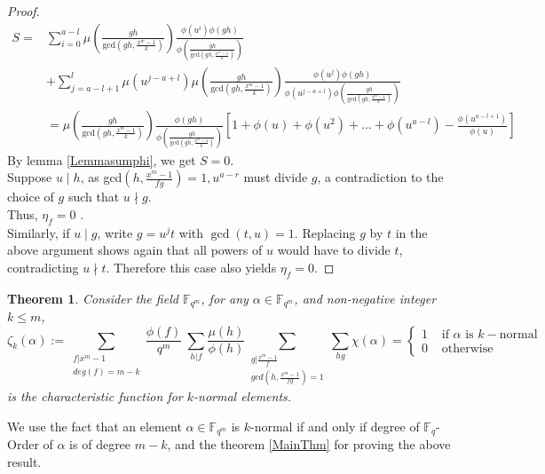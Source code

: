 \documentclass[12pt,a4paper]{article}
\theoremstyle{plain}
\newtheorem{thm}{Theorem}[section]
\theoremstyle{definition}
\numberwithin{equation}{section}
\begin{document}
\begin{proof}
        \begin{align*}
            S =& \displaystyle \sum_{i=0}^{a-l} \mu \left( \frac{gh}{\text{gcd}(gh,\frac{x^m-1}{k})}\right) \frac{\phi(u^i)\phi(gh)}{\phi\left( \frac{gh}{\text{gcd}(gh,\frac{x^m-1}{k})}\right)} \\&+ \sum_{j=a-l+1}^{l} \mu(u^{j-a+l})  \mu \left( \frac{gh}{\text{gcd}(gh,\frac{x^m-1}{k})}\right) \frac{\phi(u^j)\phi(gh)}{\phi(u^{j-a+l})\phi\left( \frac{gh}{\text{gcd}(gh,\frac{x^m-1}{k})}\right)}   \\
            &= \mu \left( \frac{gh}{\text{gcd}(gh,\frac{x^m-1}{k})}\right) \frac{\phi(gh)}{\phi\left( \frac{gh}{\text{gcd}(gh,\frac{x^m-1}{k})}\right)}\left[1+\phi(u)+\phi(u^2)+\dots+ \phi(u^{a-l})-\frac{\phi(u^{a-l+1})}{\phi(u)}\right]
        \end{align*}
        By lemma \ref{Lemmasumphi}, we get $S=0$.\\
        
        Suppose $u \mid h$, as gcd$(h,\frac{x^m-1}{fg}) = 1, u^{a-r}$ must divide $g$, a contradiction to the choice of $g$ such that $u \nmid g$.\\           
        Thus, $\eta_f = 0$ .\\
        Similarly, if $u \mid g$, write $g = u^j t$ with $\gcd(t,u)=1$.  Replacing $g$ by $t$ in the above argument shows again that all powers of $u$ would have to divide $t$, contradicting $u\nmid t$.  Therefore this case also yields $\eta_f = 0$.

     \end{proof}
     \begin{thm}
         Consider the field $\mathbb{F}_{q^m}$, for any $\alpha \in \mathbb{F}_{q^m}$, and non-negative integer $k\leq m$,
         $$\zeta_k(\alpha) := \displaystyle    \sum_{\substack{f\vert x^m-1 \\ deg(f)=m-k}}\frac{\phi(f)}{q^m}\
         \sum_{h\vert f} \frac{\mu(h)}{\phi(h)} \sum_{\substack{g \vert \frac{x^m-1}{f}\\ gcd(h,\frac{x^m-1}{fg}) =1} } \sum_{hg} \chi(\alpha) =
         \begin{cases}
             1 & \text{ if } \alpha \text{ is } k- \text{normal } \\
             0 & \text{ otherwise}
        \end{cases}$$ is the characteristic function for $k$-normal elements.
    \end{thm}
    We use the fact that an element $\alpha \in \mathbb{F}_{q^m}$ is $k$-normal if and only if degree of $\mathbb{F}_q$-Order of $\alpha$ is of degree $m-k$, and the theorem \ref{MainThm} for proving the above result.
      
\end{document}
